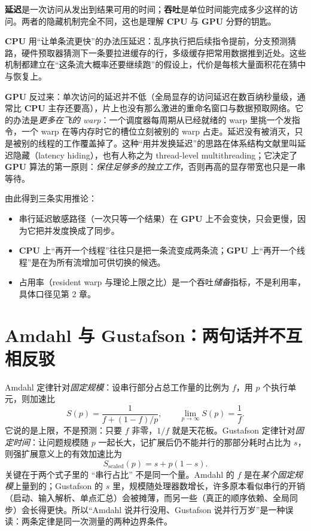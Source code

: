 \documentclass[12pt,a4paper,fontset=fandol]{ctexbook}
\newcommand{\Dom}[1]{\textsf{\bfseries #1}}
\newcommand{\CPU}{\Dom{CPU}}
\newcommand{\GPU}{\Dom{GPU}}
\begin{document}
\textbf{延迟}是一次访问从发出到结果可用的时间；\textbf{吞吐}是单位时间能完成多少这样的访问。两者的隐藏机制完全不同，这也是理解 \CPU{} 与 \GPU{} 分野的钥匙。

\CPU{} 用``让单条流更快''的办法压延迟：乱序执行把后续指令提前，分支预测猜路，硬件预取器猜测下一条要拉进缓存的行，多级缓存把常用数据推到近处。这些机制都建立在``这条流大概率还要继续跑''的假设上，代价是每核大量面积花在猜中与恢复上。

\GPU{} 反过来：单次访问的延迟并不低（全局显存的访问延迟在数百纳秒量级，通常比 \CPU{} 主存还要高），片上也没有那么激进的重命名窗口与数据预取网络。它的办法是\emph{更多在飞的 warp}：一个调度器每周期从已经就绪的 warp 里挑一个发指令，一个 warp 在等内存时它的槽位立刻被别的 warp 占走。延迟没有被消灭，只是被别的线程的工作覆盖掉了。这种``用并发换延迟''的思路在体系结构文献里叫延迟隐藏（latency hiding），也有人称之为 thread-level multithreading；它决定了 \GPU{} 算法的第一原则：\emph{保住足够多的独立工作}，否则再高的显存带宽也只是一串等待。

由此得到三条实用推论：
\begin{itemize}
\item 串行延迟敏感路径（一次只等一个结果）在 \GPU{} 上不会变快，只会更慢，因为它把并发度换成了同步。
\item \CPU{} 上``再开一个线程''往往只是把一条流变成两条流；\GPU{} 上``再开一个线程''是在为所有流增加可供切换的候选。
\item 占用率（resident warp 与理论上限之比）是一个吞吐\emph{储备}指标，不是利用率，具体口径见第 2 章。
\end{itemize}

\section{Amdahl 与 Gustafson：两句话并不互相反驳}

Amdahl 定律针对\emph{固定规模}：设串行部分占总工作量的比例为 $f$，用 $p$ 个执行单元，则加速比
\[
S(p)=\frac{1}{f+(1-f)/p},\qquad \lim_{p\rightarrow\infty}S(p)=\frac{1}{f}.
\]
它说的是上限，不是预测：只要 $f$ 非零，$1/f$ 就是天花板。Gustafson 定律针对\emph{固定时间}：让问题规模随 $p$ 一起长大，记扩展后仍不能并行的那部分耗时占比为 $s$，则强扩展意义上的有效加速比为
\[
S_{\text{scaled}}(p)=s+p(1-s).
\]
关键在于两个式子里的 ``串行占比'' 不是同一个量。Amdahl 的 $f$ 是在\emph{某个固定规模}上量到的；Gustafson 的 $s$ 里，规模随处理器数增长，许多原本看似串行的开销（启动、输入解析、单点汇总）会被摊薄，而另一些（真正的顺序依赖、全局同步）会长得更快。所以``Amdahl 说并行没用、Gustafson 说并行万岁''是一种误读：两条定律是同一次测量的两种边界条件。
\end{document}
